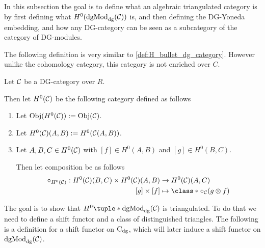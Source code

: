 In this subsection the goal is to define what an algebraic triangulated category is by first defining what \( H^0(\operatorname{dgMod}_{\operatorname{dg}}({\mathcal{C}})) \) is, and then defining the DG-Yoneda embedding, and how any DG-category can be seen as a subcategory of the category of DG-modules.

The following definition is very similar to \autoref{def:H_bullet_dg_category}. However unlike the cohomology category, this category is not enriched over \( C \).

\begin{definition}
    Let \( {\mathcal{C}} \) be a DG-category over \( R \).

    Then let \( H^0({\mathcal{C}}) \) be the following category defined as follows
    \begin{enumerate}
        \item {
            Let \( \operatorname{Obj}(H^0({\mathcal{C}})) := \operatorname{Obj}({\mathcal{C}}) \).
        }
        \item {
            Let \( H^0({\mathcal{C}})(A, B) := H^0({\mathcal{C}}(A, B)) \).
        }
        \item {
            Let \( A, B, C \in H^0({\mathcal{C}}) \) with \( [f] \in H^0(A, B) \) and \( [g] \in H^0(B, C) \).

            Then let composition be as follows
            \begin{align*}
                \circ_{H^0(\Cc)}: H^0(\Cc)(B, C) \times H^0(\Cc)(A, B) &\to H^0(\Cc)(A, C) \\
                [g] \times [f] &\mapsto \class*{ \circ_{\Cc}(g \otimes f) }
            \end{align*}
        }
    \end{enumerate}
\end{definition}

The goal is to show that \( H^0\tuple*{\dgMod_{\dg}(\Cc)} \) is triangulated. To do that we need to define a shift functor and a class of distinguished triangles. The following is a definition for a shift functor on \( \operatorname{C}_{\operatorname{dg}} \), which will later induce a shift functor on \( \operatorname{dgMod}_{\operatorname{dg}}({\mathcal{C}}) \).

